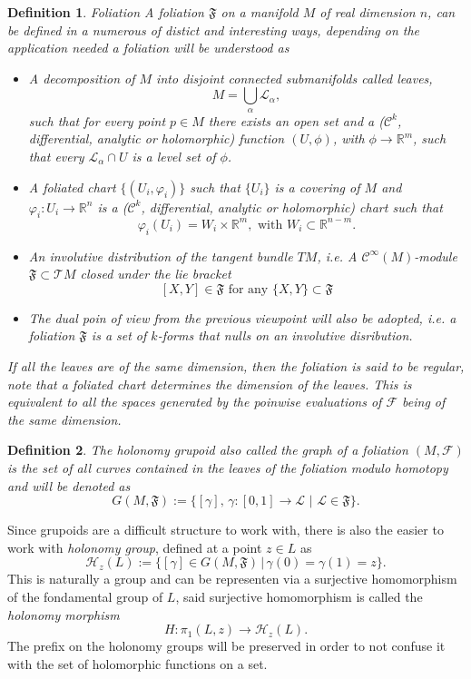 \documentclass[12pt,twoside,a4paper]{report}
\newtheorem{definition}{Definition}[section]
\newcommand{\re}{\ensuremath{\mathbb R }}
\begin{document}
\begin{definition}{Foliation}
A foliation $\mathfrak{F}$ on a manifold $M$ of real dimension $n$, can be defined in a numerous of distict and interesting ways, depending on the application needed a foliation will be understood as
\begin{itemize}
  \item A decomposition of $M$ into disjoint connected submanifolds called \emph{leaves},
        \[
          M=\bigcup_{\alpha}\mathcal{L_{\alpha}},
        \]
        \noindent such that for every point $p\in M$ there exists an open set and a ($\mathcal{C}^{k}$, differential, analytic or holomorphic) function $(U,\phi)$, with $\phi\rightarrow\re^{m}$, such that every $\mathcal{L}_{\alpha}\cap U$ is a level set of $\phi$.
  \item A \emph{foliated chart} $\{(U_{i},\varphi_{i})\}$ such that $\{U_{i}\}$ is a covering of $M$ and $\varphi_{i}:U_{i}\rightarrow\re^{n}$ is a ($\mathcal{C}^{k}$, differential, analytic or holomorphic) chart such that
        \[
          \varphi_{i}(U_{i})=W_{i}\times\re^{m},\text{ with }W_{i}\subset\re^{n-m}.
        \]
      \item An \emph{involutive} distribution of the tangent bundle $TM$, i.e. A $\mathcal{C}^{\infty}(M)$-module $\mathfrak{F}\subset\mathcal{T}M$ closed under the lie bracket
        \[
          [X,Y]\in\mathfrak{F}\text{ for any } \{X,Y\}\subset\mathfrak{F}
        \]
  \item The dual poin of view from the previous viewpoint will also be adopted, i.e. a foliation $\mathfrak{F}$ is a set of $k$-forms that nulls on an involutive disribution.
\end{itemize}

If all the leaves are of the same dimension, then the foliation is said to be \emph{regular}, note that a foliated chart determines the dimension of the leaves. This is equivalent to all the spaces generated by the poinwise evaluations of $\mathcal{F}$ being of the same dimension.
\end{definition}

\begin{definition}
The \emph{holonomy grupoid} also called the \emph{graph} of a foliation $(M,\mathcal{F})$ is the set of all curves contained in the leaves of the foliation \textit{modulo homotopy} and will be denoted as 
\[
G(M,\mathfrak{F}):=\{[\gamma],\,\gamma:[0,1]\rightarrow\mathcal{L}\,\,\vert\,\,\mathcal{L}\in\mathfrak{F}\}.
\]
\end{definition}
Since grupoids are a difficult structure to work with, there is also the easier to work with \emph{holonomy group}, defined at a point $z\in L$ as
\[
\mathcal{H}_z(L):=\{[\gamma]\in G(M,\mathfrak{F})\,|\,\gamma(0)=\gamma(1)=z\}.
\]
This is naturally a group and can be representen via a surjective homomorphism of the fondamental group of $L$, said surjective homomorphism is called the \emph{holonomy morphism}
\[
H:\pi_{1}(L,z)\rightarrow\mathcal{H}_z(L).
\]
The prefix on the holonomy groups will be preserved in order to not confuse it with the set of holomorphic functions on a set.
\end{document}
